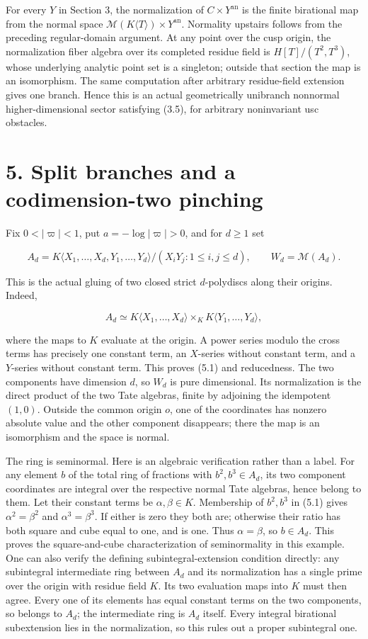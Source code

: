 \documentclass[11pt,a4paper]{article}
\begin{document}
For every \(Y\) in Section 3, the normalization of \(C\times Y^{\mathrm{an}}\) is the finite birational map from the normal space \(\mathcal M(K\langle T\rangle)\times Y^{\mathrm{an}}\). Normality upstairs follows from the preceding regular-domain argument. At any point over the cusp origin, the normalization fiber algebra over its completed residue field is \(H[T]/(T^2,T^3)\), whose underlying analytic point set is a singleton; outside that section the map is an isomorphism. The same computation after arbitrary residue-field extension gives one branch. Hence this is an actual geometrically unibranch nonnormal higher-dimensional sector satisfying (3.5), for arbitrary noninvariant usc obstacles.

\section*{5. Split branches and a codimension-two pinching}

Fix \(0<|\varpi|<1\), put \(a=-\log|\varpi|>0\), and for \(d\geq1\) set

\[
A_d=K\langle X_1,\ldots,X_d,Y_1,\ldots,Y_d\rangle/
(X_iY_j:1\leq i,j\leq d),\qquad W_d=\mathcal M(A_d).
\]

This is the actual gluing of two closed strict \(d\)-polydiscs along their origins. Indeed,

\[
A_d\simeq K\langle X_1,\ldots,X_d\rangle
\times_K K\langle Y_1,\ldots,Y_d\rangle, \tag{5.1}
\]

where the maps to \(K\) evaluate at the origin. A power series modulo the cross terms has precisely one constant term, an \(X\)-series without constant term, and a \(Y\)-series without constant term. This proves (5.1) and reducedness. The two components have dimension \(d\), so \(W_d\) is pure dimensional. Its normalization is the direct product of the two Tate algebras, finite by adjoining the idempotent \((1,0)\). Outside the common origin \(o\), one of the coordinates has nonzero absolute value and the other component disappears; there the map is an isomorphism and the space is normal.

The ring is seminormal. Here is an algebraic verification rather than a label. For any element \(b\) of the total ring of fractions with \(b^2,b^3\in A_d\), its two component coordinates are integral over the respective normal Tate algebras, hence belong to them. Let their constant terms be \(\alpha,\beta\in K\). Membership of \(b^2,b^3\) in (5.1) gives \(\alpha^2=\beta^2\) and \(\alpha^3=\beta^3\). If either is zero they both are; otherwise their ratio has both square and cube equal to one, and is one. Thus \(\alpha=\beta\), so \(b\in A_d\). This proves the square-and-cube characterization of seminormality in this example. One can also verify the defining subintegral-extension condition directly: any subintegral intermediate ring between \(A_d\) and its normalization has a single prime over the origin with residue field \(K\). Its two evaluation maps into \(K\) must then agree. Every one of its elements has equal constant terms on the two components, so belongs to \(A_d\); the intermediate ring is \(A_d\) itself. Every integral birational subextension lies in the normalization, so this rules out a proper subintegral one.
\end{document}
